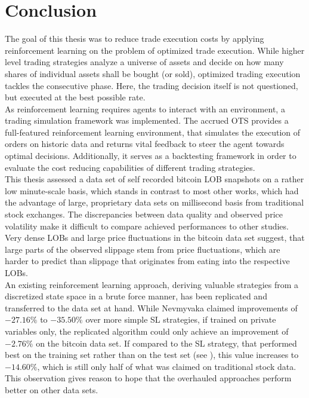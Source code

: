\chapter{Conclusion}\label{chap:conclusion}
The goal of this thesis was to reduce trade execution costs by applying reinforcement learning on the problem of optimized trade execution. While higher level trading strategies analyze a universe of assets and decide on how many shares of individual assets shall be bought (or sold), optimized trading execution tackles the consecutive phase. Here, the trading decision itself is not questioned, but executed at the best possible rate.\\

As reinforcement learning requires agents to interact with an environment, a trading simulation framework was implemented. The accrued \ac{OTS} provides a full-featured reinforcement learning environment, that simulates the execution of orders on historic data and returns vital feedback to steer the agent towards optimal decisions. Additionally, it serves as a backtesting framework in order to evaluate the cost reducing capabilities of different trading strategies.\\

This thesis assessed a data set of self recorded bitcoin \ac{LOB} snapshots on a rather low minute-scale basis, which stands in contrast to most other works, which had the advantage of large, proprietary data sets on millisecond basis from traditional stock exchanges. The discrepancies between data quality and observed price volatility make it difficult to compare achieved performances to other studies. Very dense \ac{LOB}s and large price fluctuations in the bitcoin data set suggest, that large parts of the observed slippage stem from price fluctuations, which are harder to predict than slippage that originates from eating into the respective \ac{LOB}s.\\

An existing reinforcement learning approach, deriving valuable strategies from a discretized state space in a brute force manner, has been replicated and transferred to the data set at hand. While Nevmyvaka \etal \Cite{Nevmyvaka:2006} claimed improvements of $-27.16\%$ to $-35.50\%$ over more simple \ac{SL} strategies, if trained on private variables only, the replicated algorithm could only achieve an improvement of $-2.76\%$ on the bitcoin data set. If compared to the \ac{SL} strategy, that performed best on the training set rather than on the test set (see ), this value increases to $-14.60\%$, which is still only half of what was claimed on traditional stock data. This observation gives reason to hope that the overhauled approaches perform better on other data sets.\\






